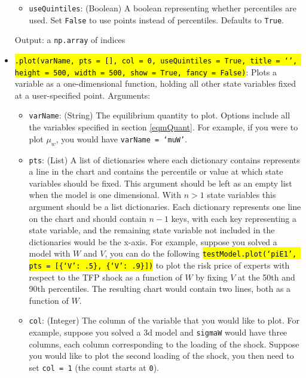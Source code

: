 \documentclass[12pt]{article}
\newcommand{\wealthSymbol}{$W$\xspace}
\newcommand{\stochasticVolSymbol}{$V$\xspace}
\newcommand{\stochasticVolProg}{V}
\DeclareRobustCommand{\hlCODE}[1]{{\sethlcolor{backcolour}\hl{#1}}}
\begin{document}
\begin{itemize}
\begin{itemize}
            \item \texttt{useQuintiles}: (Boolean) A boolean representing whether percentiles
            are used. Set \texttt{False} to use points instead of percentiles.
            Defaults to \texttt{True}.
        \end{itemize}

		Output: a \texttt{np.array} of indices
		
        \item \hlCODE{\texttt{.plot(varName, pts = [], col = 0, useQuintiles = True, title = `', height = 500, width = 500, show = True, fancy = False)}}: Plots a variable as a one-dimensional function, holding
        all other state variables fixed at a user-specified point. Arguments:
        \begin{itemize}
            \item \texttt{varName}: (String) The equilibrium quantity to plot. Options
            include all the variables specified in section \ref{eqmQuant}. For example, if you were to plot $\mu_w$, you would have \texttt{varName = `muW'}.
            \item \texttt{pts}: (List) A list of dictionaries where each dictionary contains represents a line in the chart and contains the percentile or value at which state variables should be fixed. This argument should be left as an empty list when the model is one dimensional. With $n > 1$ state variables this argument should be a list dictionaries. Each dictionary represents one line on the chart and should contain $n - 1$ keys, with each key representing a state variable, and the remaining state variable not included in the dictionaries would be the x-axis. For example, suppose you solved a model with \wealthSymbol and \stochasticVolSymbol, you can do the following \hlCODE{\texttt{testModel.plot(`piE1', pts = [\{`\stochasticVolProg': .5\}, \{`\stochasticVolProg': .9\}])}} to plot the risk price of experts with respect to the TFP shock as a function of \wealthSymbol by fixing \stochasticVolSymbol at the 50th and 90th percentiles. The resulting chart would contain two lines, both as a function of \wealthSymbol.
            \item \texttt{col}: (Integer) The column of the variable that you would like to plot. For example, suppose you solved a 3d model and \texttt{sigmaW} would have three columns, each column corresponding to the loading of the shock. Suppose you would like to plot the second loading of the shock, you then need to set \texttt{col = 1} (the count starts at \texttt{0}).

\end{itemize}
\end{itemize}
\end{document}
